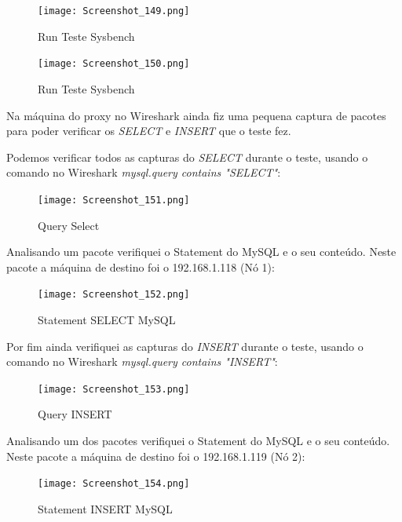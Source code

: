\begin{figure}[H]
\center
\texttt{[image: Screenshot\_149.png]}
\caption{Run Teste Sysbench}
\end{figure}

\begin{figure}[H]
\center
\texttt{[image: Screenshot\_150.png]}
\caption{Run Teste Sysbench}
\end{figure}

\newpage
Na máquina do proxy no Wireshark ainda fiz uma pequena captura de pacotes para poder verificar os \textit{SELECT} e \textit{INSERT} que o teste fez. 

Podemos verificar todos as capturas do \textit{SELECT} durante o teste, usando o comando no Wireshark \textit{mysql.query contains "SELECT"}:

\begin{figure}[H]
\center
\texttt{[image: Screenshot\_151.png]}
\caption{Query Select}
\end{figure}

Analisando um pacote verifiquei o Statement do MySQL e o seu conteúdo. Neste pacote a máquina de destino foi o 192.168.1.118 (Nó 1):

\begin{figure}[H]
\center
\texttt{[image: Screenshot\_152.png]}
\caption{Statement SELECT MySQL}
\end{figure}

\newpage
Por fim ainda verifiquei as capturas do \textit{INSERT} durante o teste, usando o comando no Wireshark \textit{mysql.query contains "INSERT"}:

\begin{figure}[H]
\center
\texttt{[image: Screenshot\_153.png]}
\caption{Query INSERT}
\end{figure}

Analisando um dos pacotes verifiquei o Statement do MySQL e o seu conteúdo. Neste pacote a máquina de destino foi o 192.168.1.119 (Nó 2):

\begin{figure}[H]
\center
\texttt{[image: Screenshot\_154.png]}
\caption{Statement INSERT MySQL}
\end{figure}